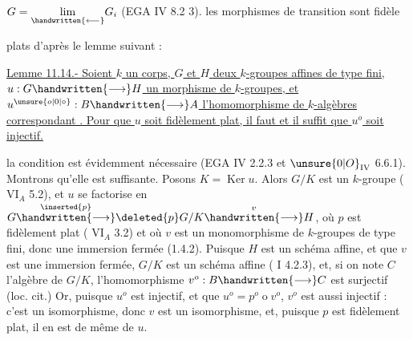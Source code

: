 
$G=\underset{\handwritten{\longleftarrow}}{\lim}G_i$ (EGA IV 8.2 3).  les morphismes de transition sont fidèle plats d'après le lemme suivant :


\uline{Lemme 11.14.- Soient $k$ un corps, $G$ et $H$ deux $k$-groupes affines de type fini, $u:G\handwritten{\longrightarrow}H$ un morphisme de $k$-groupes, et $u^{\unsure{o|0|\circ}}:B\handwritten{\longrightarrow}A$ l'homomorphisme de $k$-algèbres correspondant . Pour que $u$ soit fidèlement plat, il faut et il suffit que $u^o$ soit injectif.}

la condition est évidemment nécessaire (EGA IV 2.2.3 et $\unsure{0|O}_{\mathrm{IV}}$ 6.6.1). Montrons qu'elle est suffisante. Posons $K=\operatorname{Ker}u$. Alors $G/K$ est un $k$-groupe ( $\mathrm{VI}_A$ 5.2), et $u$ se factorise en $G\overset{\inserted{p}}{\handwritten{\longrightarrow}}\deleted{p}G/K\overset{v}{\handwritten{\longrightarrow}}H$, où $p$ est fidèlement plat ( $\mathrm{VI}_A$ 3.2) et où $v$ est un monomorphisme de $k$-groupes de type fini, donc une immersion fermée (1.4.2). Puisque $H$ est un schéma affine, et que $v$ est une immersion fermée, $G/K$ est un schéma affine ( I 4.2.3), et, si on note $C$ l'algèbre de $G/K$, l'homomorphisme $v^o:B\handwritten{\longrightarrow}C$ est surjectif (loc. cit.) Or, puisque $u^o$ est injectif, et que $u^o=p^o\mathbin{o}v^o$, $v^o$ est aussi injectif : c'est un isomorphisme, donc $v$ est un isomorphisme, et, puisque $p$ est fidèlement plat, il en est de même de $u$.

